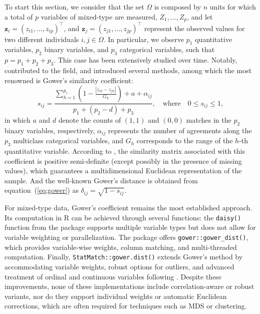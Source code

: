 To start this section, we consider that the set $\Omega$ is composed by $n$ units for which a total of $p$ variables of mixed-type are measured, $Z_1, \dots, Z_p$, and let $\mathbf{z}_{i} = (z_{i1}, \dots, z_{ip})^{\top}$, and $\mathbf{z}_{j} = (z_{j1}, \dots, z_{jp})^{\top}$ represent the observed values for two different individuals $i,j \in \Omega$. In particular, we observe $p_1$ quantitative variables, $p_2$ binary variables, and $p_3$ categorical variables, such that $p=p_1+p_2+p_3$. This case has been extensively studied over time. Notably, \cite{estabrook1966general} contributed to the field, and \cite{gower1971general} introduced several methods, among which the most renowned is Gower’s similarity coefficient:
\begin{equation} 
\label{eq:gower}
    s_{ij} = \frac{\sum_{h=1}^{p_1} \left ( 1-\frac{|z_{ih}-z_{jh}|}{G_{h}} \right ) +a + \alpha_{ij}}{p_1 +(p_2 - d)+ p_3}, \quad \text{where} \quad 0 \leq s_{ij} \leq 1,
\end{equation}
in which $a$ and $d$ denote the counts of $(1,1)$ and $(0,0)$ matches in the $p_2$ binary variables, respectively, $\alpha_{ij}$ represents the number of agreements along the $p_3$ multiclass categorical variables, and $G_h$ corresponds to the range of the $h$-th quantitative variable. 
According to \cite{gower1971general}, the similarity matrix associated with this coefficient is positive semi-definite (except possibly in the presence of missing values), which guarantees a multidimensional Euclidean representation of the sample. And the well-known Gower's distance is obtained from equation~(\ref{eq:gower}) as $\delta_{ij} =\sqrt{1 - s_{ij}}$.

For mixed-type data, Gower’s coefficient remains the most established approach. Its computation in R can be achieved through several functions: the \texttt{daisy()} function from the  package \citep{clusterpackage} supports multiple variable types but does not allow for variable weighting or parallelization. The  package \citep{gowerpackage} offers \texttt{gower::gower\_dist()}, which provides variable-wise weights, column matching, and multi-threaded computation. Finally, \texttt{StatMatch::gower.dist()} extends Gower’s method by accommodating variable weights, robust options for outliers, and advanced treatment of ordinal and continuous variables following \citep{alma991002953269704213}. Despite these improvements, none of these implementations include correlation-aware or robust variants, nor do they support individual weights or automatic Euclidean corrections, which are often required for techniques such as MDS or clustering.

